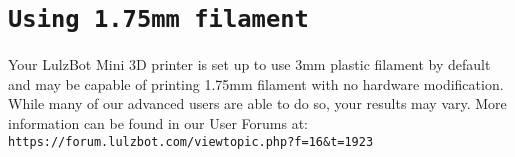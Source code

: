 
\section{\texttt{Using 1.75mm filament}}

Your LulzBot Mini 3D printer is set up to use 3mm plastic filament by default and may be capable of printing 1.75mm filament with no hardware modification. While many of our advanced users are able to do so, your results may vary.  More information can be found in our User Forums at: \texttt{https://forum.lulzbot.com/viewtopic.php?f=16\&t=1923} 
